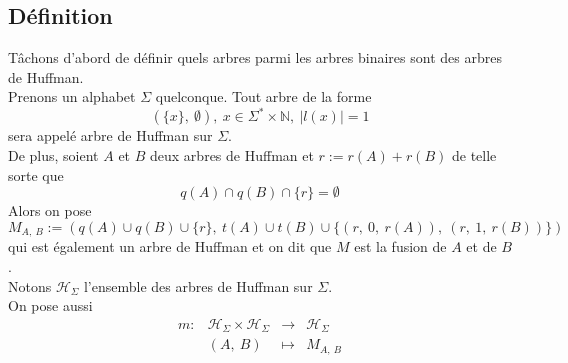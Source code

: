 \documentclass[a4paper, 12pt]{article}
\begin{document}
\subsection{Définition}
Tâchons d'abord de définir quels arbres parmi les arbres binaires sont des arbres de Huffman. \\
Prenons un alphabet $\Sigma$ quelconque. Tout arbre de la forme
$$
(\{x\},\ \emptyset),\ x \in \Sigma^*\times \mathbb{N},\ |l(x)| = 1
$$
sera appelé arbre de Huffman sur $\Sigma$. \\
De plus, soient $A$ et $B$ deux arbres de Huffman et $r := r(A)+r(B)$ de telle sorte que
$$
q(A) \cap q(B) \cap \{r\} = \emptyset
$$
Alors on pose
$$
M_{A,\ B} := (q(A) \cup q(B) \cup \{r\},\ t(A)\cup t(B)\cup \{(r,\ 0,\ r(A)),\ (r,\ 1,\ r(B))\})
$$
qui est également un arbre de Huffman et on dit que $M$ est la fusion de $A$ et de $
B$. \\
Notons $\mathcal{H}_\Sigma$ l'ensemble des arbres de Huffman sur $\Sigma$. \\
On pose aussi
$$
\begin{matrix}
m: &\mathcal{H}_\Sigma\times \mathcal{H}_\Sigma &\rightarrow &\mathcal{H}_\Sigma \\
&(A,\ B) &\mapsto &M_{A,\ B}
\end{matrix}
$$
\end{document}
